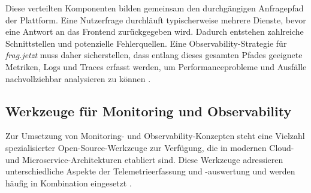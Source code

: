 Diese verteilten Komponenten bilden gemeinsam den durchgängigen Anfragepfad der Plattform. Eine Nutzerfrage durchläuft typischerweise mehrere Dienste, bevor eine Antwort an das Frontend zurückgegeben wird. Dadurch entstehen zahlreiche Schnittstellen und potenzielle Fehlerquellen. Eine Observability-Strategie für \textit{frag.jetzt} muss daher sicherstellen, dass entlang dieses gesamten Pfades geeignete Metriken, Logs und Traces erfasst werden, um Performanceprobleme und Ausfälle nachvollziehbar analysieren zu können \cite{faseeha2025observability}.

\subsection{Werkzeuge für Monitoring und Observability}

Zur Umsetzung von Monitoring- und Observability-Konzepten steht eine Vielzahl spezialisierter Open-Source-Werkzeuge zur Verfügung, die in modernen Cloud- und Microservice-Architekturen etabliert sind. Diese Werkzeuge adressieren unterschiedliche Aspekte der Telemetrieerfassung und -auswertung und werden häufig in Kombination eingesetzt \cite{banerjee2024comparative}.


